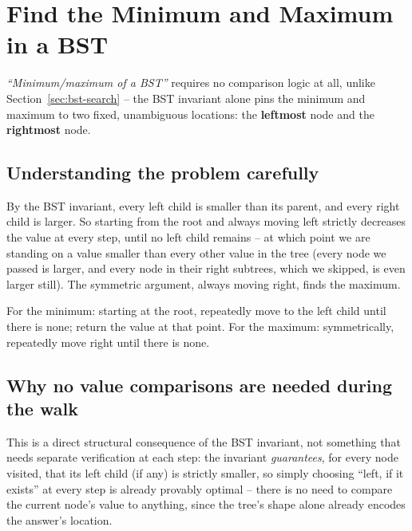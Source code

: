 \section{Find the Minimum and Maximum in a BST}
\label{sec:bst-min-max}


\begin{patternbox}
\emph{``Minimum/maximum of a BST''} requires no comparison logic at all,
unlike Section~\ref{sec:bst-search} -- the BST invariant alone pins the
minimum and maximum to two fixed, unambiguous locations: the
\textbf{leftmost} node and the \textbf{rightmost} node.
\end{patternbox}

\subsection*{Understanding the problem carefully}

By the BST invariant, every left child is smaller than its parent, and
every right child is larger. So starting from the root and always moving
left strictly decreases the value at every step, until no left child
remains -- at which point we are standing on a value smaller than every
other value in the tree (every node we passed is larger, and every node in
their right subtrees, which we skipped, is even larger still). The
symmetric argument, always moving right, finds the maximum.

\begin{ideabox}
For the minimum: starting at the root, repeatedly move to the left child
until there is none; return the value at that point. For the maximum:
symmetrically, repeatedly move right until there is none.
\end{ideabox}

\subsection*{Why no value comparisons are needed during the walk}

This is a direct structural consequence of the BST invariant, not
something that needs separate verification at each step: the invariant
\emph{guarantees}, for every node visited, that its left child (if any) is
strictly smaller, so simply choosing ``left, if it exists'' at every step
is already provably optimal -- there is no need to compare the current
node's value to anything, since the tree's shape alone already encodes
the answer's location.

